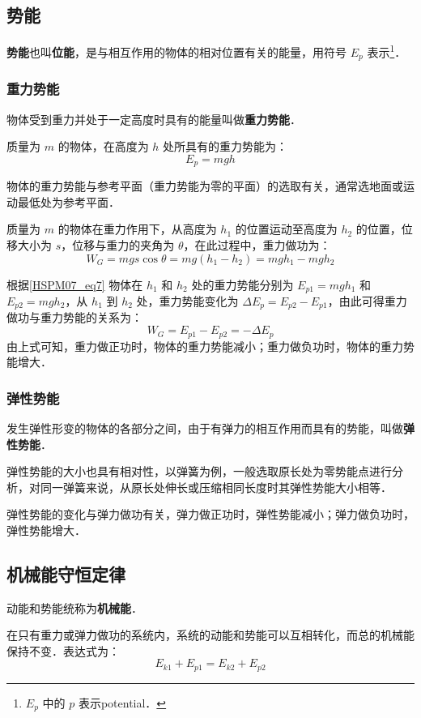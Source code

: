 \subsection{势能}

\textbf{势能}也叫\textbf{位能}，是与相互作用的物体的相对位置有关的能量，用符号 $E_p$ 表示\footnote{$E_p$ 中的 $p$ 表示potential．}．

\subsubsection{重力势能}

物体受到重力并处于一定高度时具有的能量叫做\textbf{重力势能}．

质量为 $m$ 的物体，在高度为 $h$ 处所具有的重力势能为：
\begin{equation}\label{HSPM07_eq7}
E_p=mgh
\end{equation}

物体的重力势能与参考平面（重力势能为零的平面）的选取有关，通常选地面或运动最低处为参考平面．

质量为 $m$ 的物体在重力作用下，从高度为 $h_1$ 的位置运动至高度为 $h_2$ 的位置，位移大小为 $s$，位移与重力的夹角为 $\theta$，在此过程中，重力做功为：
\begin{equation}
W_G=mgs\cos \theta=mg(h_1-h_2)=mgh_1-mgh_2
\end{equation}

根据\autoref{HSPM07_eq7} 物体在 $h_1$ 和 $h_2$ 处的重力势能分别为 $E_{p1}=mgh_1$ 和 $E_{p2}=mgh_2$，从 $h_1$ 到 $h_2$ 处，重力势能变化为 $\Delta E_p= E_{p2}-E_{p1}$，由此可得重力做功与重力势能的关系为：
\begin{equation}
W_G=E_{p1}-E_{p2}=-\Delta E_p
\end{equation}
由上式可知，重力做正功时，物体的重力势能减小；重力做负功时，物体的重力势能增大．

\subsubsection{弹性势能}

发生弹性形变的物体的各部分之间，由于有弹力的相互作用而具有的势能，叫做\textbf{弹性势能}．

弹性势能的大小也具有相对性，以弹簧为例，一般选取原长处为零势能点进行分析，对同一弹簧来说，从原长处伸长或压缩相同长度时其弹性势能大小相等．

弹性势能的变化与弹力做功有关，弹力做正功时，弹性势能减小；弹力做负功时，弹性势能增大．

\subsection{机械能守恒定律}

动能和势能统称为\textbf{机械能}．

在只有重力或弹力做功的系统内，系统的动能和势能可以互相转化，而总的机械能保持不变．表达式为：
\begin{equation}
E_{k1}+E_{p1}=E_{k2}+E_{p2}
\end{equation}

